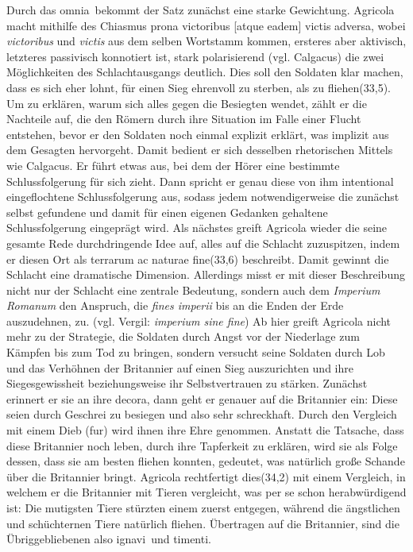 \documentclass[12pt]{article}
\begin{document}
	Durch das \glqq omnia\grqq\ bekommt der Satz zunächst eine starke Gewichtung. Agricola macht mithilfe des Chiasmus \glqq prona victoribus [atque eadem] victis adversa\grqq, wobei \textit{victoribus} und \textit{victis} aus dem selben Wortstamm kommen, ersteres aber aktivisch, letzteres passivisch konnotiert ist, stark polarisierend (vgl. Calgacus) die zwei Möglichkeiten des Schlachtausgangs deutlich. Dies soll den Soldaten klar machen, dass es sich eher lohnt, für einen Sieg ehrenvoll zu sterben, als zu fliehen(33,5). Um zu erklären, warum sich alles gegen die Besiegten wendet, zählt er die Nachteile auf, die den Römern durch ihre Situation im Falle einer Flucht entstehen, bevor er den Soldaten noch einmal explizit erklärt, was implizit aus dem Gesagten hervorgeht. Damit bedient er sich desselben rhetorischen Mittels wie Calgacus. Er führt etwas aus, bei dem der Hörer eine bestimmte Schlussfolgerung für sich zieht. Dann spricht er genau diese von ihm intentional eingeflochtene Schlussfolgerung aus, sodass jedem notwendigerweise die zunächst selbst gefundene und damit für einen eigenen Gedanken gehaltene Schlussfolgerung eingeprägt wird. Als nächstes greift Agricola wieder die seine gesamte Rede durchdringende Idee auf, alles auf die Schlacht zuzuspitzen, indem er diesen Ort als \glqq terrarum ac naturae fine\grqq(33,6) beschreibt. Damit gewinnt die Schlacht eine dramatische Dimension. Allerdings misst er mit dieser Beschreibung nicht nur der Schlacht eine zentrale Bedeutung, sondern auch dem \textit{Imperium Romanum} den Anspruch, die \textit{fines imperii} bis an die Enden der Erde auszudehnen, zu. (vgl. Vergil: \textit{imperium sine fine})
	Ab hier greift Agricola nicht mehr zu der Strategie, die Soldaten durch Angst vor der Niederlage zum Kämpfen bis zum Tod zu bringen, sondern versucht seine Soldaten durch Lob und das Verhöhnen der Britannier auf einen Sieg auszurichten und ihre Siegesgewissheit beziehungsweise ihr Selbstvertrauen zu stärken. Zunächst erinnert er sie an ihre \glqq decora\grqq, dann geht er genauer auf die Britannier ein: Diese seien durch Geschrei zu besiegen und also sehr schreckhaft. Durch den Vergleich mit einem Dieb (\glqq fur\grqq) wird ihnen ihre Ehre genommen. Anstatt die Tatsache, dass diese Britannier noch leben, durch ihre Tapferkeit zu erklären, wird sie als Folge dessen, dass sie am besten fliehen konnten, gedeutet, was natürlich große Schande über die Britannier bringt. 
	Agricola rechtfertigt dies(34,2) mit einem Vergleich, in welchem er die Britannier mit Tieren vergleicht, was per se schon herabwürdigend ist: Die mutigsten Tiere stürzten einem zuerst entgegen, während die ängstlichen und schüchternen Tiere natürlich fliehen. Übertragen auf die Britannier, sind die Übriggebliebenen also \glqq ignavi\grqq\ und \glqq timenti\grqq.
\end{document}
